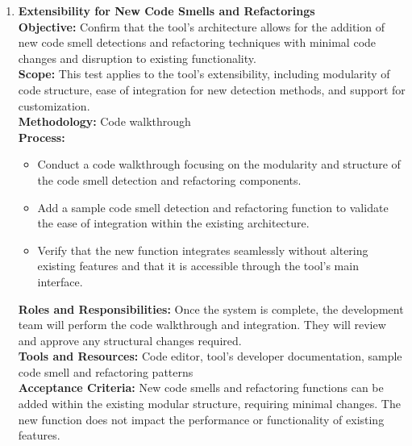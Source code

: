 \documentclass[12pt, titlepage]{article}
\begin{document}
  \begin{enumerate}[label={\bf \textcolor{Maroon}{test-MS-\arabic*}},
      wide=0pt, font=\itshape]
    \item \textbf{Extensibility for New Code Smells and Refactorings} \\[2mm]
      \textbf{Objective:} Confirm that the tool’s architecture allows
      for the addition of new code smell detections and refactoring
      techniques with minimal code changes and disruption to existing
      functionality. \\[2mm]
      \textbf{Scope:} This test applies to the tool’s extensibility,
      including modularity of code structure, ease of integration for
      new detection methods, and support for customization. \\[2mm]
      \textbf{Methodology:} Code walkthrough \\[2mm]
      \textbf{Process:}
      \begin{itemize}
        \item Conduct a code walkthrough focusing on the modularity
          and structure of the code smell detection and refactoring components.
        \item Add a sample code smell detection and refactoring
          function to validate the ease of integration within the
          existing architecture.
        \item Verify that the new function integrates seamlessly
          without altering existing features and that it is
          accessible through the tool’s main interface.
      \end{itemize}
      \textbf{Roles and Responsibilities:} Once the system is
      complete, the development team will perform the code
      walkthrough and integration. They will review and approve any
      structural changes required. \\[2mm]
      \textbf{Tools and Resources:} Code editor, tool’s developer
      documentation, sample code smell and refactoring patterns \\[2mm]
      \textbf{Acceptance Criteria:} New code smells and refactoring
      functions can be added within the existing modular structure,
      requiring minimal changes. The new function does not impact the
      performance or functionality of existing features.


\end{enumerate}
\end{document}
